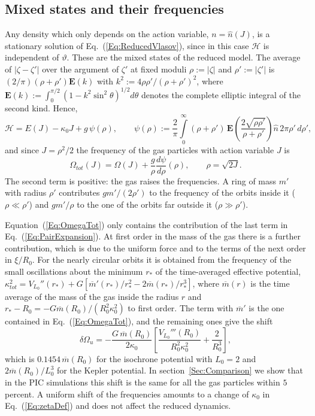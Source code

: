 \documentclass[prd,aps,nofootinbib,superscriptaddress,amsmath,amssymb]{revtex4}
\begin{document}
\subsection{Mixed states and their frequencies}
\label{SubSec:Mixed}

Any density which only depends on the action variable, $n = \hat{n}(J)$, is a stationary solution of Eq.~(\ref{Eq:ReducedVlasov}), since in this case $\mathcal{H}$ is independent of $\vartheta$. These are the mixed states of the reduced model. The average of $|\zeta - \zeta'|$ over the argument of $\zeta'$ at fixed moduli $\rho := |\zeta|$ and $\rho' := |\zeta'|$ is $(2/\pi)(\rho + \rho')\mathbf{E}(k)$ with $k^2 := 4\rho\rho'/(\rho + \rho')^2$, where $\mathbf{E}(k) := \int_0^{\pi/2}(1 - k^2\sin^2\theta)^{1/2} d\theta$ denotes the complete elliptic integral of the second kind. Hence,
\begin{equation}
\mathcal{H} = E(J) - \kappa_0 J + g\,\psi(\rho),\qquad
\psi(\rho) := \frac{2}{\pi}\int\limits_0^\infty (\rho + \rho')\,\mathbf{E}\left( \frac{2\sqrt{\rho\rho'}}{\rho + \rho'} \right) \hat{n}\, 2\pi\rho'\, d\rho',
\label{Eq:psiMixed}
\end{equation}
and since $J = \rho^2/2$ the frequency of the gas particles with action variable $J$ is
\begin{equation}
\Omega_{tot}(J) = \Omega(J) + \frac{g}{\rho}\frac{d\psi}{d\rho}(\rho),\qquad \rho = \sqrt{2J}.
\label{Eq:OmegaTot}
\end{equation}
The second term is positive: the gas raises the frequencies. A ring of mass $m'$ with radius $\rho'$ contributes $g m'/(2\rho')$ to the frequency of the orbits inside it ($\rho\ll\rho'$) and $g m'/\rho$ to the one of the orbits far outside it ($\rho\gg\rho'$).

Equation~(\ref{Eq:OmegaTot}) only contains the contribution of the last term in Eq.~(\ref{Eq:PairExpansion}). At first order in the mass of the gas there is a further contribution, which is due to the uniform force and to the terms of the next order in $\xi/R_0$. For the nearly circular orbits it is obtained from the frequency of the small oscillations about the minimum $r_*$ of the time-averaged effective potential, $\kappa_{tot}^2 = V_{L_0}''(r_*) + G[\overline{m}'(r_*)/r_*^2 - 2\overline{m}(r_*)/r_*^3]$, where $\overline{m}(r)$ is the time average of the mass of the gas inside the radius $r$ and $r_* - R_0 = -G\overline{m}(R_0)/(R_0^2\kappa_0^2)$ to first order. The term with $\overline{m}'$ is the one contained in Eq.~(\ref{Eq:OmegaTot}), and the remaining ones give the shift
\begin{equation}
\delta\Omega_u = -\frac{G\,\overline{m}(R_0)}{2\kappa_0}\left[ \frac{V_{L_0}'''(R_0)}{R_0^2\kappa_0^2} + \frac{2}{R_0^3} \right],
\label{Eq:UniformShift}
\end{equation}
which is $0.1454\,\overline{m}(R_0)$ for the isochrone potential with $L_0 = 2$ and $2\overline{m}(R_0)/L_0^3$ for the Kepler potential. In section~\ref{Sec:Comparison} we show that in the PIC simulations this shift is the same for all the gas particles within $5$ percent. A uniform shift of the frequencies amounts to a change of $\kappa_0$ in Eq.~(\ref{Eq:zetaDef}) and does not affect the reduced dynamics.
\end{document}
